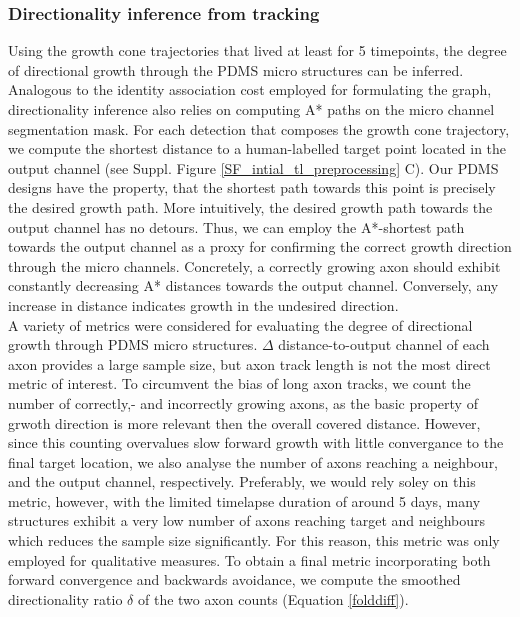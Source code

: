 \subsubsection{Directionality inference from tracking}
\label{inferring_directionality}
Using the growth cone trajectories that lived at least for 5 timepoints, the
degree of directional growth through the PDMS micro structures can be inferred.
Analogous to the identity association cost employed for formulating the graph,
directionality inference also relies on computing A* paths on the micro channel
segmentation mask. For each detection that composes the growth cone trajectory,
we compute the shortest distance to a human-labelled target point located in the
output channel (see Suppl. Figure \ref{SF_intial_tl_preprocessing} C). Our PDMS
designs have the property, that the shortest path towards this point is
precisely the desired growth path. More intuitively, the desired growth path
towards the output channel has no detours. Thus, we can employ the A*-shortest
path towards the output channel as a proxy for confirming the correct growth
direction through the micro channels. Concretely, a correctly growing axon
should exhibit constantly decreasing A* distances towards the output channel.
Conversely, any increase in distance indicates growth in the undesired
direction. \\

A variety of metrics were considered for evaluating the degree of directional
growth through PDMS micro structures. $\Delta$ distance-to-output channel of
each axon provides a large sample size, but axon track length is not the most
direct metric of interest. To circumvent the bias of long axon tracks, we count
the number of correctly,- and incorrectly growing axons, as the basic property
of grwoth direction is more relevant then the overall covered distance. However,
since this counting overvalues slow forward growth with little convergance to
the final target location, we also analyse the number of axons reaching a
neighbour, and the output channel, respectively. Preferably, we would rely soley
on this metric, however, with the limited timelapse duration of around 5 days,
many structures exhibit a very low number of axons reaching target and
neighbours which reduces the sample size significantly. For this reason, this
metric was only employed for qualitative measures. To obtain a final metric
incorporating both forward convergence and backwards avoidance, we compute the
smoothed directionality ratio $\delta $ of the two axon counts (Equation
\ref{folddiff}).

